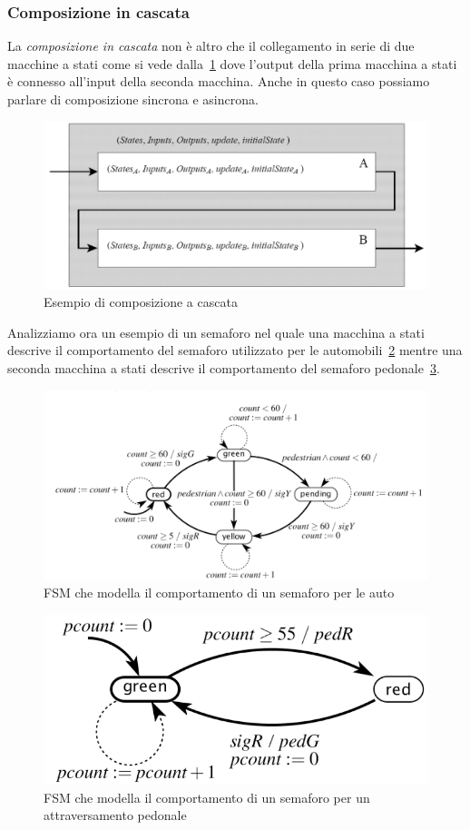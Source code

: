 \subsubsection{Composizione in cascata}
La \emph{composizione in cascata} non è altro che il collegamento in serie di due macchine a stati come si vede dalla \figurename\,\ref{fig:cascade} dove l'output della prima macchina a stati è connesso all'input della seconda macchina. Anche in questo caso possiamo parlare di composizione sincrona e asincrona. 
\begin{figure}
\centering
\includegraphics[scale=0.4]{img/cascade.png}
\caption{Esempio di composizione a cascata}\label{fig:cascade}
\end{figure}
Analizziamo ora un esempio di un semaforo nel quale una macchina a stati descrive il comportamento del semaforo utilizzato per le automobili \figurename\,\ref{fig:semaforoauto} mentre una seconda macchina a stati descrive il comportamento del semaforo pedonale \figurename\,\ref{fig:semaforoped}. 
\begin{figure}
\centering
\includegraphics[scale=0.4]{img/semaforoauto.png}
\caption{FSM che modella il comportamento di un semaforo per le auto}\label{fig:semaforoauto}
\end{figure}
\begin{figure}
\centering
\includegraphics[scale=0.4]{img/semaforoped.png}
\caption{FSM che modella il comportamento di un semaforo per un attraversamento pedonale}\label{fig:semaforoped}
\end{figure}
